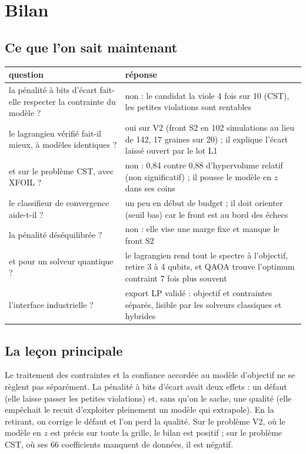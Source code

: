 \chapter{Bilan}\label{ch:bilan}

\section{Ce que l'on sait maintenant}
\begin{center}
\renewcommand{\arraystretch}{1.25}
\small
\begin{tabularx}{\linewidth}{>{\raggedright\arraybackslash}p{4.2cm} >{\raggedright\arraybackslash}X}
\toprule
question & réponse \\
\midrule
la pénalité à bits d'écart fait-elle respecter la contrainte du modèle ? & non : le candidat la viole 4 fois sur 10 (CST), les petites violations sont rentables \\
le lagrangien vérifié fait-il mieux, à modèles identiques ? & oui sur V2 (front S2 en 102 simulations au lieu de 142, 17 graines sur 20) ; il explique l'écart laissé ouvert par le lot L1 \\
et sur le problème CST, avec XFOIL ? & non : 0,84 contre 0,88 d'hypervolume relatif (non significatif) ; il pousse le modèle en $z$ dans ses coins \\
le classifieur de convergence aide-t-il ? & un peu en début de budget ; il doit orienter (seuil bas) car le front est au bord des échecs \\
la pénalité déséquilibrée ? & non : elle vise une marge fixe et manque le front S2 \\
et pour un solveur quantique ? & le lagrangien rend tout le spectre à l'objectif, retire 3 à 4 qubits, et QAOA trouve l'optimum contraint 7 fois plus souvent \\
l'interface industrielle ? & export LP validé : objectif et contraintes séparés, lisible par les solveurs classiques et hybrides \\
\bottomrule
\end{tabularx}
\end{center}

\section{La leçon principale}
Le traitement des contraintes et la confiance accordée au modèle d'objectif ne se règlent pas séparément. La pénalité à bits d'écart avait deux effets : un défaut (elle laisse passer les petites violations) et, sans qu'on le sache, une qualité (elle empêchait le recuit d'exploiter pleinement un modèle qui extrapole). En la retirant, on corrige le défaut et l'on perd la qualité. Sur le problème V2, où le modèle en $z$ est précis sur toute la grille, le bilan est positif ; sur le problème CST, où ses 66 coefficients manquent de données, il est négatif.

